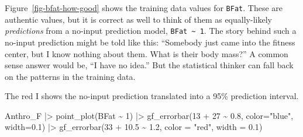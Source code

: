 \documentclass[
  letterpaper,
  DIV=11,
  numbers=noendperiod,
  oneside]{scrartcl}
\newenvironment{Shaded}{\begin{snugshade}}{\end{snugshade}}
\newcommand{\AttributeTok}[1]{\textcolor[rgb]{0.40,0.45,0.13}{#1}}
\newcommand{\DecValTok}[1]{\textcolor[rgb]{0.68,0.00,0.00}{#1}}
\newcommand{\FloatTok}[1]{\textcolor[rgb]{0.68,0.00,0.00}{#1}}
\newcommand{\FunctionTok}[1]{\textcolor[rgb]{0.28,0.35,0.67}{#1}}
\newcommand{\NormalTok}[1]{\textcolor[rgb]{0.00,0.23,0.31}{#1}}
\newcommand{\SpecialCharTok}[1]{\textcolor[rgb]{0.37,0.37,0.37}{#1}}
\newcommand{\StringTok}[1]{\textcolor[rgb]{0.13,0.47,0.30}{#1}}
\begin{document}
\begin{tcolorbox}[enhanced jigsaw, colbacktitle=quarto-callout-note-color!10!white, opacityback=0, breakable, opacitybacktitle=0.6, colback=white, coltitle=black, arc=.35mm, title=\textcolor{quarto-callout-note-color}{\faInfo}\hspace{0.5em}{How good is the prediction?}, left=2mm, colframe=quarto-callout-note-color-frame, rightrule=.15mm, bottomrule=.15mm, leftrule=.75mm, bottomtitle=1mm, toptitle=1mm, titlerule=0mm, toprule=.15mm]

Figure~\ref{fig-bfat-how-good} shows the training data values for
\texttt{BFat}. These are authentic values, but it is correct as well to
think of them as equally-likely \emph{predictions} from a
{} no-input prediction model,
\texttt{BFat\ \textasciitilde{}\ 1}. The story behind such a no-input
prediction might be told like this: ``Somebody just came into the
fitness center, but I know nothing about them. What is their body
mass?'' A common sense answer would be, ``I have no idea.'' But the
statistical thinker can fall back on the patterns in the training data.

The red I shows the no-input prediction translated into a 95\%
prediction interval.

\begin{Shaded}
\begin{Highlighting}[]
\NormalTok{Anthro\_F }\SpecialCharTok{|\textgreater{}} \FunctionTok{point\_plot}\NormalTok{(BFat }\SpecialCharTok{\textasciitilde{}} \DecValTok{1}\NormalTok{) }\SpecialCharTok{|\textgreater{}}
  \FunctionTok{gf\_errorbar}\NormalTok{(}\DecValTok{13} \SpecialCharTok{+} \DecValTok{27} \SpecialCharTok{\textasciitilde{}} \FloatTok{0.8}\NormalTok{, }\AttributeTok{color=}\StringTok{"blue"}\NormalTok{, }\AttributeTok{width=}\FloatTok{0.1}\NormalTok{) }\SpecialCharTok{|\textgreater{}}
  \FunctionTok{gf\_errorbar}\NormalTok{(}\DecValTok{33} \SpecialCharTok{+} \FloatTok{10.5} \SpecialCharTok{\textasciitilde{}} \FloatTok{1.2}\NormalTok{, }\AttributeTok{color =} \StringTok{"red"}\NormalTok{, }\AttributeTok{width =} \FloatTok{0.1}\NormalTok{)}
\end{Highlighting}
\end{Shaded}


\end{tcolorbox}
\end{document}
